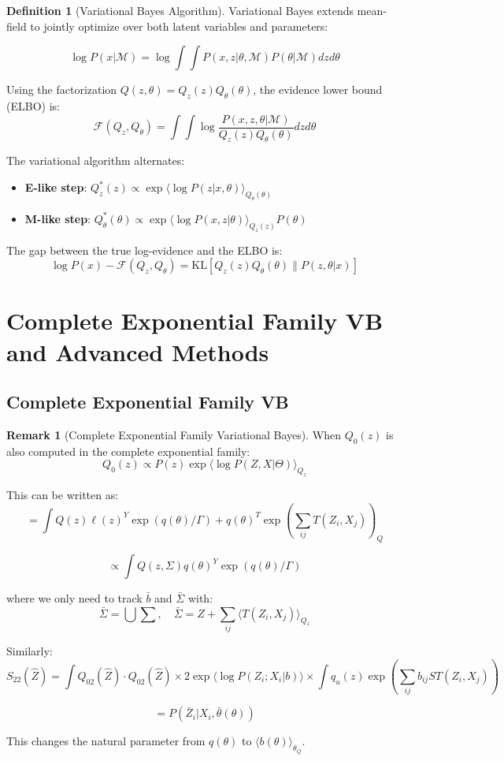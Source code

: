 \documentclass[12pt,a4paper]{article}
\theoremstyle{definition}
\newtheorem{definition}{Definition}[section]
\newtheorem{remark}{Remark}[section]
\begin{document}
\begin{definition}[Variational Bayes Algorithm]
Variational Bayes extends mean-field to jointly optimize over both latent variables and parameters:

\[
\log P(x | \mathcal{M}) = \log \int\int P(x, z | \theta, \mathcal{M}) P(\theta | \mathcal{M}) dz d\theta
\]

Using the factorization $Q(z, \theta) = Q_z(z) Q_\theta(\theta)$, the evidence lower bound (ELBO) is:
\[
\mathcal{F}(Q_z, Q_\theta) = \int\int \log \frac{P(x, z, \theta | \mathcal{M})}{Q_z(z) Q_\theta(\theta)} dz d\theta
\]

The variational algorithm alternates:
\begin{itemize}
    \item \textbf{E-like step}: $Q_z^*(z) \propto \exp \langle \log P(z | x, \theta) \rangle_{Q_\theta(\theta)}$
    
    \item \textbf{M-like step}: $Q_\theta^*(\theta) \propto \exp \langle \log P(x, z | \theta) \rangle_{Q_z(z)} P(\theta)$
\end{itemize}

The gap between the true log-evidence and the ELBO is:
\[
\log P(x) - \mathcal{F}(Q_z, Q_\theta) = \text{KL}[Q_z(z) Q_\theta(\theta) \| P(z, \theta | x)]
\]
\end{definition}

\newpage

\section{Complete Exponential Family VB and Advanced Methods}

\subsection{Complete Exponential Family VB}

\begin{remark}[Complete Exponential Family Variational Bayes]
When $Q_0(z)$ is also computed in the complete exponential family:
\[
Q_0(z) \propto P(z) \exp \langle \log P(Z, X | \Theta) \rangle_{Q_z}
\]

This can be written as:
\[
= \int Q(z) \ell(z)^Y \exp \left( q(\theta) / \Gamma \right) + q(\theta)^T \exp \left( \sum_{ij} T(Z_i, X_j) \right)_Q
\]

\[
\propto \int Q(z, \Sigma) q(\theta)^Y \exp \left( q(\theta) / \Gamma \right)
\]

where we only need to track $\bar{b}$ and $\bar{\Sigma}$ with:
\[
\bar{\Sigma} = \bigcup \sum, \quad \bar{\Sigma} = Z + \sum_{ij} \langle T(Z_i, X_j) \rangle_{Q_z}
\]

Similarly:
\[
S_{22}(\hat{Z}) = \int Q_{02}(\hat{Z}) \cdot Q_{02}(\hat{Z}) \times 2 \exp \langle \log P(Z_i; X_i | b) \rangle \times \int q_u(z) \exp \left( \sum_{ij} b_{ij} S T(Z_i, X_j) \right)
\]

\[
= P(\bar{Z}_i | X_i, \bar{\theta}(\theta))
\]

This changes the natural parameter from $q(\theta)$ to $\langle b(\theta) \rangle_{\theta_Q}$.
\end{remark}
\end{document}
